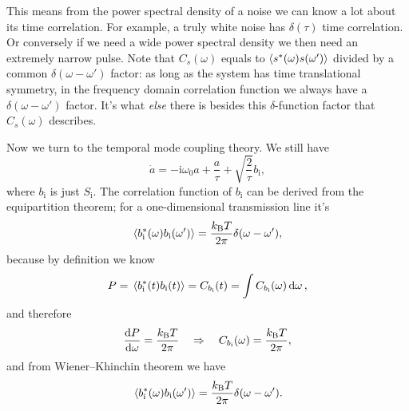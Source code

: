 \documentclass[hyperref, a4paper]{article}
\newcommand*{\ii}{\mathrm{i}}
\newcommand*{\kB}{k_{\text{B}}}
\newcommand*{\Si}{S_{\text{i}}}
\newcommand*{\bi}{b_{\text{i}}}
\begin{document}
This means from the power spectral density of a noise 
we can know a lot about its time correlation.
For example, a truly white noise has $\delta(\tau)$ time correlation.
Or conversely if we need a wide power spectral density we then need an extremely narrow pulse.
Note that $C_s(\omega)$ equals to $\expval{s^*(\omega) s(\omega')}$ divided by a common $\delta(\omega - \omega')$ factor:
as long as the system has time translational symmetry, 
in the frequency domain correlation function we always have a $\delta(\omega - \omega')$ factor.
It's what \emph{else} there is besides this $\delta$-function factor that $C_s(\omega)$ describes.

Now we turn to the temporal mode coupling theory. 
We still have 
\begin{equation}
    \dot{a} = - \ii \omega_0 a + \frac{a}{\tau} + \sqrt{\frac{2}{\tau}} \bi,
\end{equation}
where $\bi$ is just $\Si$.
The correlation function of $\bi$ can be derived from the equipartition theorem;
for a one-dimensional transmission line it's
\begin{equation}
    \expval{\bi^*(\omega) \bi(\omega')} = \frac{\kB T}{2 \pi} \delta(\omega - \omega'),
\end{equation}
because by definition we know 
\begin{equation}
    P = \expval*{\bi^*(t) \bi(t)} = C_{\bi}(t) = \int C_{\bi}(\omega) \dd{\omega} ,
\end{equation} 
and therefore 
\begin{equation}
    \dv{P}{\omega} = \frac{\kB T}{2\pi} \quad \Rightarrow \quad C_{\bi}(\omega) = \frac{\kB T}{2\pi},
\end{equation}
and from Wiener–Khinchin theorem we have 
\begin{equation}
    \expval*{\bi^*(\omega) \bi(\omega')} = \frac{\kB T}{2\pi} \delta(\omega - \omega').
\end{equation}
\end{document}
